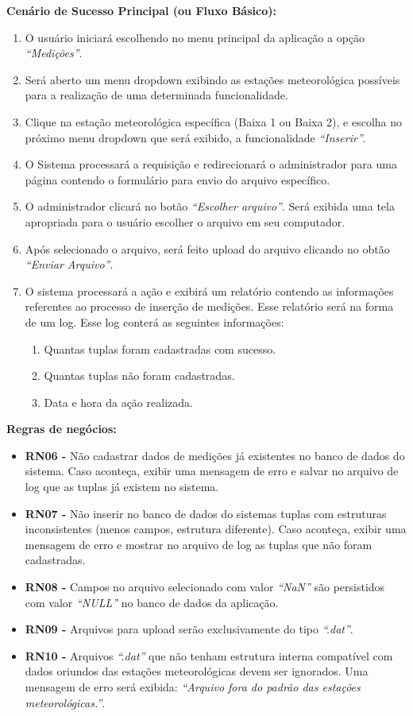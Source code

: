 \begin{mdframed}
\begin{flushleft}
		\textbf{Cenário de Sucesso Principal (ou Fluxo Básico):}\\
			\begin{enumerate}
				\item{O usuário iniciará escolhendo no menu principal da aplicação a opção \textit{``Medições''}.}
				\item{Será aberto um menu dropdown exibindo as estações meteorológica possíveis para a realização de uma determinada funcionalidade.}
				\item{Clique na estação meteorológica específica (Baixa 1 ou Baixa 2), e escolha no próximo menu dropdown que será exibido, a funcionalidade \textit{``Inserir''}.}
			 	\item O Sistema processará a requisição e redirecionará o administrador para uma página contendo o formulário para envio do arquivo específico.
				\item O administrador clicará no botão \textit{``Escolher arquivo''}. Será exibida uma tela apropriada para o usuário escolher o arquivo em seu computador.
				\item Após selecionado o arquivo, será feito upload do arquivo clicando no obtão \textit{``Enviar Arquivo''}.
				\item O sistema processará a ação e exibirá um relatório contendo as informações referentes ao processo de inserção de medições. Esse relatório será na forma de um log. Esse log conterá as seguintes informações:
				  \begin{enumerate}
						\item{Quantas tuplas foram cadastradas com sucesso.}
						\item{Quantas tuplas não foram cadastradas.}
						\item{Data e hora da ação realizada.}
					\end{enumerate}
			 \end{enumerate}

		\textbf{Regras de negócios:}
		\begin{itemize}
			\item[] \textbf{RN06 - } Não cadastrar dados de medições já existentes no banco de dados do sistema. Caso aconteça, exibir uma mensagem de erro e salvar no arquivo de log que as tuplas já existem no sistema.
			\item[] \textbf{RN07 - } Não inserir no banco de dados do sistemas tuplas com estruturas inconsistentes (menos campos, estrutura diferente). Caso aconteça, exibir uma mensagem de erro e mostrar no arquivo de log as tuplas que não foram cadastradas.
			\item[] \textbf{RN08 - } Campos no arquivo selecionado com valor \textit{``NaN''} são persistidos com valor \textit{``NULL''} no banco de dados da aplicação.
			\item[] \textbf{RN09 - } Arquivos para upload serão exclusivamente do tipo \textit{``.dat''}.
			\item[] \textbf{RN10 - } Arquivos \emph{``.dat''} que não tenham estrutura interna compatível com dados oriundos das estações meteorológicas devem ser ignorados. Uma mensagem de erro será exibida: \emph{``Arquivo fora do padrão das estações meteorológicas.''}.


\end{itemize}
\end{flushleft}
\end{mdframed}
